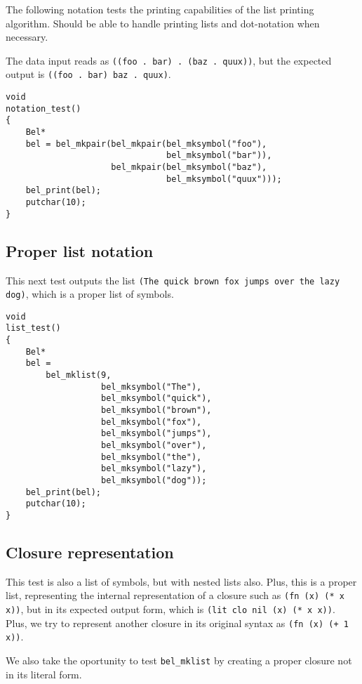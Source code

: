 \documentclass[openright,a4paper,twoside,12pt]{memoir}
\begin{document}
The following notation tests the printing capabilities of the list
printing algorithm. Should be able to handle printing lists and
dot-notation when necessary.

The data input reads as \texttt{((foo . bar) . (baz . quux))}, but the expected
output is \texttt{((foo . bar) baz . quux)}.

\begin{verbatim}
void
notation_test()
{
    Bel*
    bel = bel_mkpair(bel_mkpair(bel_mksymbol("foo"),
                                bel_mksymbol("bar")),
                     bel_mkpair(bel_mksymbol("baz"),
                                bel_mksymbol("quux")));
    bel_print(bel);
    putchar(10);
}
\end{verbatim}

\subsection{Proper list notation}
\label{sec:orgc8d46fd}

This next test outputs the list \texttt{(The quick brown fox jumps over the
lazy dog)}, which is a proper list of symbols.

\begin{verbatim}
void
list_test()
{
    Bel*
    bel =
        bel_mklist(9,
                   bel_mksymbol("The"),
                   bel_mksymbol("quick"),
                   bel_mksymbol("brown"),
                   bel_mksymbol("fox"),
                   bel_mksymbol("jumps"),
                   bel_mksymbol("over"),
                   bel_mksymbol("the"),
                   bel_mksymbol("lazy"),
                   bel_mksymbol("dog"));
    bel_print(bel);
    putchar(10);
}
\end{verbatim}

\subsection{Closure representation}
\label{sec:org385ade5}

This test is also a list of symbols, but with nested lists also. Plus,
this is a proper list, representing the internal representation of a
closure such as \texttt{(fn (x) (* x x))}, but in its expected output form,
which is \texttt{(lit clo nil (x) (* x x))}. Plus, we try to represent another
closure in its original syntax as \texttt{(fn (x) (+ 1 x))}.

We also take the oportunity to test \texttt{bel\_mklist} by creating a proper
closure not in its literal form.
\end{document}
